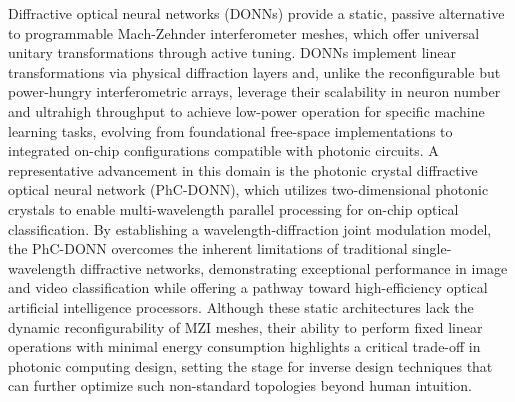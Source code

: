 Diffractive optical neural networks (DONNs) provide a static, passive alternative to programmable Mach-Zehnder interferometer meshes, which offer universal unitary transformations through active tuning. DONNs implement linear transformations via physical diffraction layers and, unlike the reconfigurable but power-hungry interferometric arrays, leverage their scalability in neuron number and ultrahigh throughput to achieve low-power operation for specific machine learning tasks, evolving from foundational free-space implementations to integrated on-chip configurations compatible with photonic circuits. A representative advancement in this domain is the photonic crystal diffractive optical neural network (PhC-DONN), which utilizes two-dimensional photonic crystals to enable multi-wavelength parallel processing for on-chip optical classification. By establishing a wavelength-diffraction joint modulation model, the PhC-DONN overcomes the inherent limitations of traditional single-wavelength diffractive networks, demonstrating exceptional performance in image and video classification while offering a pathway toward high-efficiency optical artificial intelligence processors. Although these static architectures lack the dynamic reconfigurability of MZI meshes, their ability to perform fixed linear operations with minimal energy consumption highlights a critical trade-off in photonic computing design, setting the stage for inverse design techniques that can further optimize such non-standard topologies beyond human intuition. \citep{doi_10_1002_nap2_70098_8d5f2f8a} \citep{doi_10_1515_nanoph_2025_0168_86a0f7aa}

